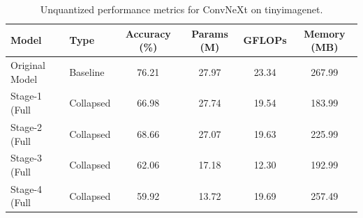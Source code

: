 \begin{table}
\caption{Unquantized performance metrics for ConvNeXt on tinyimagenet.}
\label{tab:ConvNeXt_tinyimagenet_unquant}
\begin{tabular}{llcccc}
\toprule
Model & Type & Accuracy (\%) & Params (M) & GFLOPs & Memory (MB) \\
\midrule
Original Model & Baseline & 76.21 & 27.97 & 23.34 & 267.99 \\
Stage-1 (Full & Collapsed & 66.98 & 27.74 & 19.54 & 183.99 \\
Stage-2 (Full & Collapsed & 68.66 & 27.07 & 19.63 & 225.99 \\
Stage-3 (Full & Collapsed & 62.06 & 17.18 & 12.30 & 192.99 \\
Stage-4 (Full & Collapsed & 59.92 & 13.72 & 19.69 & 257.49 \\
\bottomrule
\end{tabular}
\end{table}
